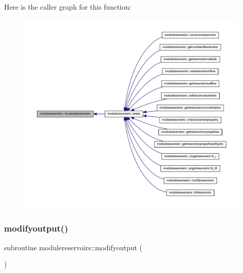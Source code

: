 Here is the caller graph for this function\+:\nopagebreak
\begin{figure}[H]
\begin{center}
\leavevmode
\includegraphics[width=350pt]{namespacemodulereservoirs_a777d3a0c23fa5c2ea11ed589e1d23711_icgraph}
\end{center}
\end{figure}
\mbox{\label{namespacemodulereservoirs_a72a469df722e5436ce882168e7d1c0bb}} 
\subsubsection{\texorpdfstring{modifyoutput()}{modifyoutput()}}
{\footnotesize\ttfamily subroutine modulereservoirs\+::modifyoutput (\begin{DoxyParamCaption}{ }\end{DoxyParamCaption})\hspace{0.3cm}{\ttfamily [private]}}

